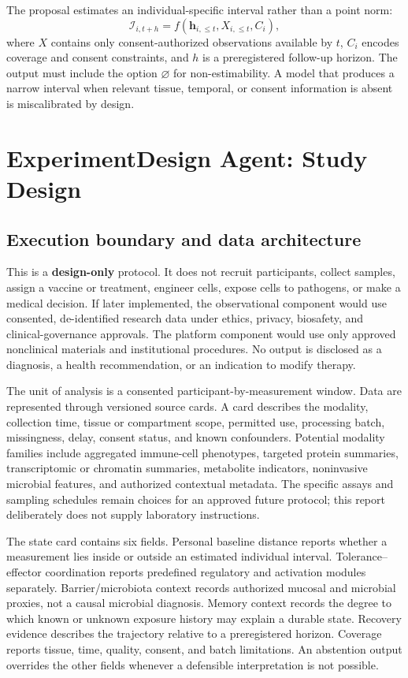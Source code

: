 \documentclass[conference]{IEEEtran}
\begin{document}
The proposal estimates an individual-specific interval rather than a point norm:
\begin{equation}
\mathcal{I}_{i,t+h}=f\left(\mathbf{h}_{i,\leq t},X_{i,\leq t},C_i\right),
\label{eq:interval}
\end{equation}
where $X$ contains only consent-authorized observations available by $t$, $C_i$ encodes coverage and consent constraints, and $h$ is a preregistered follow-up horizon. The output must include the option $\varnothing$ for non-estimability. A model that produces a narrow interval when relevant tissue, temporal, or consent information is absent is miscalibrated by design.

\section{ExperimentDesign Agent: Study Design}

\subsection{Execution boundary and data architecture}

This is a \textbf{design-only} protocol. It does not recruit participants, collect samples, assign a vaccine or treatment, engineer cells, expose cells to pathogens, or make a medical decision. If later implemented, the observational component would use consented, de-identified research data under ethics, privacy, biosafety, and clinical-governance approvals. The platform component would use only approved nonclinical materials and institutional procedures. No output is disclosed as a diagnosis, a health recommendation, or an indication to modify therapy.

The unit of analysis is a consented participant-by-measurement window. Data are represented through versioned source cards. A card describes the modality, collection time, tissue or compartment scope, permitted use, processing batch, missingness, delay, consent status, and known confounders. Potential modality families include aggregated immune-cell phenotypes, targeted protein summaries, transcriptomic or chromatin summaries, metabolite indicators, noninvasive microbial features, and authorized contextual metadata. The specific assays and sampling schedules remain choices for an approved future protocol; this report deliberately does not supply laboratory instructions.

The state card contains six fields. Personal baseline distance reports whether a measurement lies inside or outside an estimated individual interval. Tolerance--effector coordination reports predefined regulatory and activation modules separately. Barrier/microbiota context records authorized mucosal and microbial proxies, not a causal microbial diagnosis. Memory context records the degree to which known or unknown exposure history may explain a durable state. Recovery evidence describes the trajectory relative to a preregistered horizon. Coverage reports tissue, time, quality, consent, and batch limitations. An abstention output overrides the other fields whenever a defensible interpretation is not possible.
\end{document}
